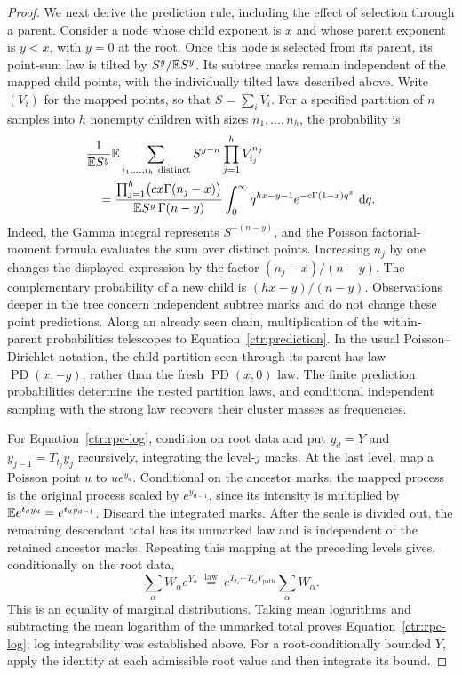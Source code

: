 \begin{proof}
We next derive the prediction rule, including the effect of selection through
a parent.  Consider a node whose child exponent is $x$ and whose parent
exponent is $y<x$, with $y=0$ at the root.  Once this node is selected from
its parent, its point-sum law is tilted by $S^y/\mathbb E S^y$.  Its subtree marks
remain independent of the mapped child points, with the individually tilted
laws described above.  Write $(V_i)$ for the mapped points, so that
$S=\sum_iV_i$.  For a specified partition of $n$ samples into $h$ nonempty
children with sizes $n_1,\ldots,n_h$, the probability is
\begin{align}
 &\frac1{\mathbb E S^y}
   \mathbb E\sum_{i_1,\ldots,i_h\ \mathrm{distinct}}
        S^{y-n}\prod_{j=1}^hV_{i_j}^{n_j} \notag\\
 &\quad=
 \frac{\prod_{j=1}^h\bigl(cx\Gamma(n_j-x)\bigr)}
      {\mathbb E S^y\,\Gamma(n-y)}
 \int_0^\infty q^{hx-y-1}
       e^{-c\Gamma(1-x)q^x}\,\,\mathrm d q.
 \label{ctr:eppf}
\end{align}
Indeed, the Gamma integral represents $S^{-(n-y)}$, and the Poisson
factorial-moment formula evaluates the sum over distinct points.  Increasing
$n_j$ by one changes the displayed expression by the factor
$(n_j-x)/(n-y)$.  The complementary probability of a new child is
$(hx-y)/(n-y)$.  Observations deeper in the tree concern independent subtree
marks and do not change these point predictions.  Along an already seen
chain, multiplication of the within-parent probabilities telescopes to
Equation~\eqref{ctr:prediction}.  In the usual Poisson--Dirichlet notation,
the child partition
seen through its parent has law $\operatorname{PD}(x,-y)$, rather than the
fresh $\operatorname{PD}(x,0)$ law.  The finite prediction probabilities
determine the nested partition laws, and conditional independent sampling
with the strong law recovers their cluster masses as frequencies.

For Equation~\eqref{ctr:rpc-log}, condition on root data and put $y_d=Y$ and
$y_{j-1}=T_{t_j}y_j$ recursively, integrating the level-$j$ marks.  At the
last level, map a Poisson point $u$ to $ue^{y_d}$.  Conditional on the
ancestor marks, the mapped process is the original process scaled by
$e^{y_{d-1}}$, since its intensity is multiplied by
$\mathbb E e^{t_dy_d}=e^{t_dy_{d-1}}$.  Discard the integrated marks.  After the
scale is divided out, the remaining descendant total has its unmarked law
and is independent of the retained ancestor marks.  Repeating this mapping
at the preceding levels gives, conditionally on the root data,
\[
 \sum_\alpha W_\alpha e^{Y_\alpha}
 \ \stackrel{\mathrm{law}}{=}\
 e^{T_{t_1}\cdots T_{t_d}Y_{\mathrm{path}}}
       \sum_\alpha W_\alpha.
\]
This is an equality of marginal distributions.  Taking mean logarithms and
subtracting the mean logarithm of the unmarked total proves
Equation~\eqref{ctr:rpc-log}; log integrability was established above.
For a root-conditionally bounded $Y$, apply the identity at each admissible
root value and then integrate its bound.


\end{proof}
